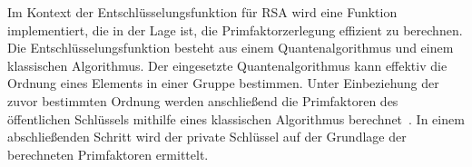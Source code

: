 Im Kontext der Entschlüsselungsfunktion für RSA wird eine Funktion implementiert,
die in der Lage ist, die Primfaktorzerlegung effizient zu berechnen.
Die Entschlüsselungsfunktion besteht aus einem Quantenalgorithmus und einem klassischen Algorithmus.
Der eingesetzte Quantenalgorithmus kann effektiv die Ordnung eines Elements in einer Gruppe bestimmen. 
Unter Einbeziehung der zuvor bestimmten Ordnung werden anschließend die Primfaktoren des öffentlichen Schlüssels mithilfe eines klassischen Algorithmus berechnet~\cite{Shor_1997}.
In einem abschließenden Schritt wird der private Schlüssel auf der Grundlage der berechneten Primfaktoren ermittelt.





